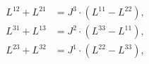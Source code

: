 \begin{equation}
\begin{aligned}
   L^{12}+L^{21} &= J^3\cdot (L^{11}-L^{22}) , \\
   L^{31}+L^{13} &= J^2\cdot(L^{33}-L^{11}) , \\
   L^{23}+L^{32} &= J^1\cdot(L^{22}-L^{33}) ,
\end{aligned}
\end{equation}

